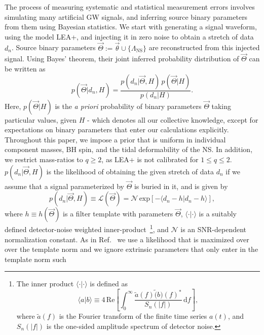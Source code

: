 \documentclass[aps,prd,amsmath,floats,floatfix, twocolumn,
superscriptaddress,nofootinbib,showpacs]{revtex4-1}
\newcommand{\red}{\textcolor{red}}
\newcommand{\D}{\mathrm{d}}
\newcommand{\lambdans}{\Lambda_\mathrm{NS}}
\newcommand{\LL}{\mathcal{L}}
\begin{document}
The process of measuring systematic and statistical measurement errors
involves simulating many artificial GW signals, and inferring source binary
parameters from them using Bayesian statistics.
We start with generating a signal waveform, using the model LEA+, and injecting
it in zero noise to obtain a stretch of data $d_n$. Source binary parameters
$\vec{\Theta}:=\vec{\theta}\cup\{\lambdans\}$ are reconstructed from this
injected signal. Using Bayes' theorem, their joint inferred probability
distribution of $\vec{\Theta}$ can be written	 as
\begin{equation}\label{eq:postprob}
 p(\vec{\Theta} | d_n, H) = \dfrac{p(d_n|\vec{\Theta}, H)\,p(\vec{\Theta} | H)}{p(d_n|H)}.
\end{equation}
Here, $p(\vec{\Theta} | H)$ is the {\it a priori} probability of binary parameters
$\vec{\Theta}$
taking particular values, given $H$ - which denotes all our collective knowledge,
except for expectations on binary parameters that enter
our calculations explicitly. Throughout this paper, we impose a prior that is
uniform in
individual component masses, BH spin, and the tidal deformability of the NS. In
addition, we restrict mass-ratios to $q\geq 2$, as LEA+ is not calibrated for 
$1\leq q\leq 2$. $p(d_n|\vec{\Theta}, H)$ is the
likelihood of obtaining the given stretch of data $d_n$ if we assume that a
signal parameterized by $\vec{\Theta}$ is buried in it, and is given by
\begin{equation}\label{eq:likelihood}
 p(d_n| \vec{\Theta}, H) \equiv \LL(\vec{\Theta}) = \mathcal{N}\, \mathrm{exp}[- \langle d_n - h | d_n - h\rangle ],
\end{equation}
where $h\equiv h(\vec{\Theta})$ is a filter template with parameters 
$\vec{\Theta}$, $\langle\cdot|\cdot\rangle$ is a suitably defined
detector-noise weighted inner-product~\footnote{The inner product
$\langle\cdot|\cdot\rangle$  is defined as~\cite{Shoemaker2009}
\begin{equation}
\langle a|b\rangle \equiv 4\,\mathrm{Re}\left[\int_0^\infty \dfrac{\tilde{a}(f) \tilde(b)(f)^*}{S_n(|f|)}\,\D f\right],
\end{equation}
where $\tilde{a}(f)$ is the Fourier transform of the finite time series $a(t)$,
and $S_n(|f|)$ is the one-sided amplitude spectrum of detector noise.}, and
$\mathcal{N}$ is an SNR-dependent normalization constant.
As in Ref.~\cite{Purrer:2015nkh} we use a likelihood that is maximized over
over the template norm
and we ignore extrinsic parameters that only enter in the template norm such
\end{document}
